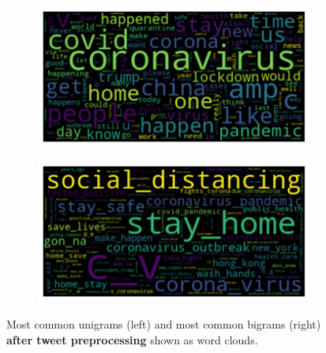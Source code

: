 \begin{figure}
    \centering
    \begin{subfigure}{0.49\columnwidth}
        \includegraphics[width=1\textwidth]{images/uni_af.png}
    \end{subfigure}
    \centering
    \begin{subfigure}{0.49\columnwidth}
        \includegraphics[width=1\textwidth]{images/bi_af.png}
    \end{subfigure}
    \caption{Most common unigrams (left) and most common bigrams (right) \textbf{after tweet preprocessing} shown as word clouds.}
    \label{fig:uni_bi_af}
\end{figure}

